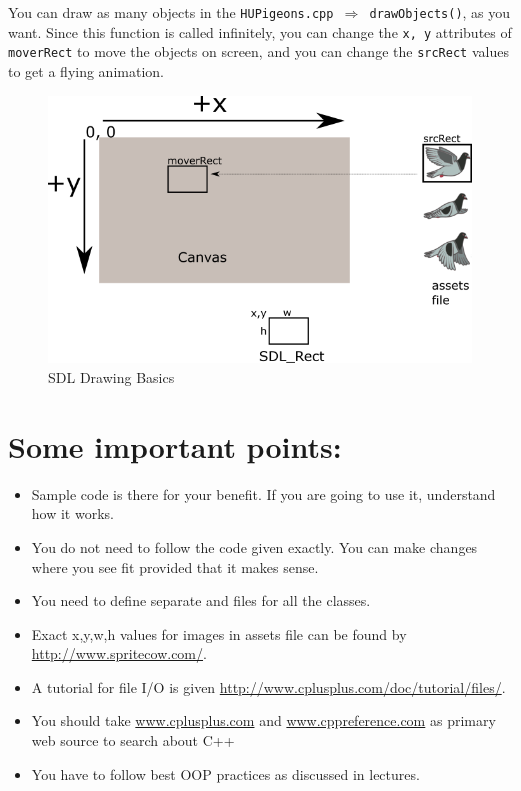 \documentclass[a4paper,12pt]{article}
\begin{document}
	You can draw as many objects in the \texttt{HUPigeons.cpp $ \Rightarrow $ drawObjects()}, as you want. Since this function is called infinitely, you can change the \texttt{x, y} attributes of \texttt{moverRect} to move the objects on screen, and you can change the \texttt{srcRect} values to get a flying animation.
	
	\begin{figure}
		\includegraphics[width=\linewidth]{sdlDrawing}
		\caption{SDL Drawing Basics}
		\label{fig:sdlDrawing}
	\end{figure}
	
	\section{Some important points:} 
	
	\begin{itemize}
		\item Sample code is there for your benefit. If you are going to use it, understand how it works. 
		\item You do not need to follow the code given exactly. You can make changes where you see fit provided that it makes sense.

		\item You need to define separate  and  files for all the classes.
		\item Exact x,y,w,h values for images in assets file can be found by \url{http://www.spritecow.com/}. 
		\item A tutorial for file I/O is given \url{http://www.cplusplus.com/doc/tutorial/files/}. 
		\item You should take \url{www.cplusplus.com} and \url{www.cppreference.com} as primary web source to search about C++
		\item You have to follow best OOP practices as discussed in lectures.
	\end{itemize}
\end{document}
